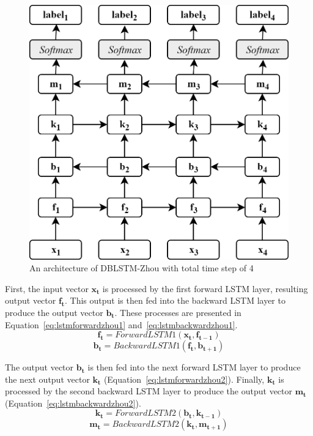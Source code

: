 \begin{figure}
	\centering
	\includegraphics[width=0.75\linewidth]{images/dblstmzhou}
	\caption{An architecture of DBLSTM-Zhou with total time step of 4}
	\label{fig:dblstmzhou}
\end{figure}

First, the input vector $\mathbf{x_{t}}$ is processed by the first forward LSTM layer, resulting output vector $\mathbf{f_{t}}$. This output is then fed into the backward LSTM layer to produce the output vector $\mathbf{b_{t}}$. These processes are presented in Equation~\ref{eq:lstmforwardzhou1} and~\ref{eq:lstmbackwardzhou1}.
\begin{equation}
\label{eq:lstmforwardzhou1}
\mathbf{f_{t}} = ForwardLSTM1(\mathbf{x_{t}}, \mathbf{f_{t-1}})
\end{equation}
\begin{equation}
\label{eq:lstmbackwardzhou1}
\mathbf{b_{t}} = BackwardLSTM1(\mathbf{f_{t}}, \mathbf{b_{t+1}})
\end{equation}

The output vector $\mathbf{b_{t}}$ is then fed into the next forward LSTM layer to produce the next output vector $\mathbf{k_{t}}$ (Equation~\ref{eq:lstmforwardzhou2}). Finally, $\mathbf{k_{t}}$ is processed by the second backward LSTM layer to produce the output vector $\mathbf{m_{t}}$ (Equation~\ref{eq:lstmbackwardzhou2}).
\begin{equation}
\label{eq:lstmforwardzhou2}
\mathbf{k_{t}} = ForwardLSTM2(\mathbf{b_{t}}, \mathbf{k_{t-1}})
\end{equation}
\begin{equation}
\label{eq:lstmbackwardzhou2}
\mathbf{m_{t}} = BackwardLSTM2(\mathbf{k_{t}}, \mathbf{m_{t+1}})
\end{equation}

